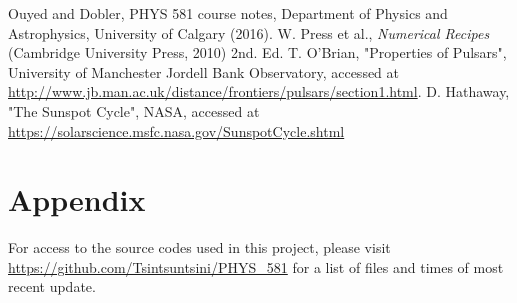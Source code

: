 \documentclass[twocolumn]{article}
\begin{document}
\begin{thebibliography}{00}
	Ouyed and Dobler, PHYS 581 course notes, Department of Physics and Astrophysics, University of Calgary (2016).
	W. Press et al., \emph{Numerical Recipes} (Cambridge University Press, 2010) 2nd. Ed.
	T. O'Brian, "Properties of Pulsars", University of Manchester Jordell Bank Observatory, accessed at \url{http://www.jb.man.ac.uk/distance/frontiers/pulsars/section1.html}.
	D. Hathaway, "The Sunspot Cycle",  NASA, accessed at \url{ https://solarscience.msfc.nasa.gov/SunspotCycle.shtml}
\end{thebibliography}

\section{Appendix}
For access to the source codes used in this project, please visit \url{https://github.com/Tsintsuntsini/PHYS_581} for a list of files and times of most recent update.
	
\end{document}
